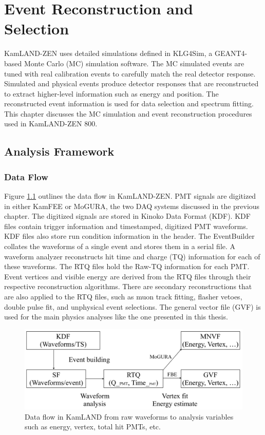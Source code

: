 \chapter{Event Reconstruction and Selection}
\label{chapter:reco_select}
\thispagestyle{myheadings}

\graphicspath{{3_Chapter_KLZ_Reconstruction_and_Selection/Figures/}}

KamLAND-ZEN uses detailed simulations defined in KLG4Sim, a GEANT4-based Monte Carlo (MC) simulation software. The MC simulated events are tuned with real calibration events to carefully match the real detector response. Simulated and physical events produce detector responses that are reconstructed to extract higher-level information such as energy and position. The reconstructed event information is used for data selection and spectrum fitting. This chapter discusses the MC simulation and event reconstruction procedures used in KamLAND-ZEN 800.

\section{Analysis Framework}
\subsection{Data Flow}
Figure \ref{fig:dataflow} outlines the data flow in KamLAND-ZEN. PMT signals are digitized in either KamFEE or MoGURA, the two DAQ systems discussed in the previous chapter. The digitized signals are stored in Kinoko Data Format (KDF). KDF files contain trigger information and timestamped, digitized PMT waveforms. KDF files also store run condition information in the header. The EventBuilder collates the waveforms of a single event and stores them in a serial file. A waveform analyzer reconstructs hit time and charge (TQ) information for each of these waveforms. The RTQ files hold the Raw-TQ information for each PMT. Event vertices and visible energy are derived from the RTQ files through their respective reconstruction algorithms. There are secondary reconstructions that are also applied to the RTQ files, such as muon track fitting, flasher vetoes, double pulse fit, and unphysical event selections. The general vector file (GVF) is used for the main physics analyses like the one presented in this thesis.

\begin{figure}[htb]
	\centering
	\includegraphics[scale=0.3]{dataflow.png}
	\caption{Data flow in KamLAND from raw waveforms to analysis variables such as energy, vertex, total hit PMTs, etc. \cite{ozaki_phd}}
	\label{fig:dataflow}
\end{figure}

